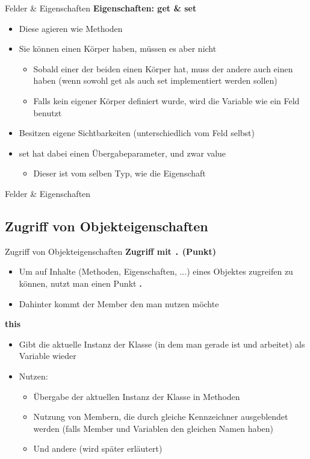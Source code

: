 \begin{frame}{Felder \& Eigenschaften}
	\textbf{Eigenschaften: get \& set}
	\begin{itemize}
		\item Diese agieren wie Methoden
		\item Sie können einen Körper haben, müssen es aber nicht
		\begin{itemize}
			\item Sobald einer der beiden einen Körper hat, muss der andere auch einen haben (wenn sowohl \alert{get} als auch \alert{set} implementiert werden sollen)
			\item Falls kein eigener Körper definiert wurde, wird die Variable wie ein Feld benutzt
		\end{itemize}
		\item Besitzen eigene Sichtbarkeiten (unterschiedlich vom Feld selbst)
		\item \alert{set} hat dabei einen Übergabeparameter, und zwar \alert{value}
		\begin{itemize}
			\item Dieser ist vom selben Typ, wie die Eigenschaft		
		\end{itemize}		
	\end{itemize}
\end{frame}

\begin{frame}{Felder \& Eigenschaften}	
	
\end{frame}

\subsection{Zugriff von Objekteigenschaften}
\begin{frame}{Zugriff von Objekteigenschaften}
	\textbf{Zugriff mit \texttt{\alert{.}} (Punkt)}\\
	\begin{itemize}
		\item Um auf Inhalte (Methoden, Eigenschaften, ...) eines Objektes zugreifen zu können, nutzt man einen Punkt \alert{\textbf{.}}
		\item Dahinter kommt der Member den man nutzen möchte
	\end{itemize}
	\textbf{this}\\
	\begin{itemize}
		\item Gibt die aktuelle Instanz der Klasse (in dem man gerade ist und arbeitet) als Variable wieder
		\item Nutzen:
		\begin{itemize}
			\item Übergabe der aktuellen Instanz der Klasse in Methoden
			\item Nutzung von Membern, die durch gleiche Kennzeichner ausgeblendet werden (falls Member und Variablen den gleichen Namen haben)
			\item Und andere (wird später erläutert)
		\end{itemize}
	\end{itemize}
\end{frame}

